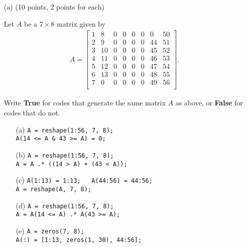 \documentclass[a4paper,10pt]{article}
\makeatletter
\newlength{\Problen}
\newlength{\Probheadlen}
\newlength{\Probskip}
\newenvironment{ProbK}{\begin{lrbox}{\@syntest}%
    \begin{minipage}\textwidth}{\end{minipage}\end{lrbox}}
\newenvironment{ProbK}[2][]{ %
    \global\setbox\@lastproblem=\vbox\bgroup
    \par\noindent\parbox[t]{\Probheadlen}{\raggedleft\fontsize{10}{10pt}\selectfont
    {\bfseries\large #2 }\\[-1.5mm]
    \rule[1mm]{16mm}{.2mm}\\[-2mm]{\sffamily #1}}\hspace{\Probskip}%
    \begin{minipage}[t]{\Problen}}{\end{minipage}\par\vspace{3mm}\egroup%
    \unvcopy\@lastproblem}
\theoremstyle{remark}
\makeatother
\begin{document}
\begin{ProbK}[pt 10]{8}
\begin{enumerate}
	\item[(a)] (10 points, 2 points for each)
	
	\vspace{1mm}
	Let $A$ be a $7 \times 8$ matrix given by
	\begin{align*}
		A =
		\begin{bmatrix}
			1 &  8 & 0 & 0 & 0 & 0 & 0 & 50\\
			2 &  9 & 0 & 0 & 0 & 0 & 44 & 51\\
			3 & 10 & 0 & 0 & 0 & 0 & 45 & 52\\
			4 & 11 & 0 & 0 & 0 & 0 & 46 & 53\\
			5 & 12 & 0 & 0 & 0 & 0 & 47 & 54\\
			6 & 13 & 0 & 0 & 0 & 0 & 48 & 55\\
			7 & 0 & 0 & 0 & 0 & 0 & 49 & 56\\
		\end{bmatrix}.
	\end{align*}
	
	Write \textbf{True} for codes that generate the same matrix $A$ as above, or \textbf{False} for codes that do not.
	
	\vspace{2mm}
	
	\begin{itemize}
		\item[(a)] 
		\verb"A = reshape(1:56, 7, 8);"\\
		\verb"A(14 <= A & 43 >= A) = 0;"
		
		\item[(b)] 
		\verb"A = reshape(1:56, 7, 8);"\\
		\verb"A = A .* ((14 > A) + (43 < A));"
		
		\item[(c)]
		\verb"A(1:13) = 1:13;   A(44:56) = 44:56;"\\
		\verb"A = reshape(A, 7, 8);"
		
		\item[(d)] 
		\verb"A = reshape(1:56, 7, 8);"\\
		\verb"A = A(14 <= A) .* A(43 >= A);"
		
		\item[(e)] 
		\verb"A = zeros(7, 8);"\\
		\verb"A(:) = [1:13, zeros(1, 30), 44:56];"
	\end{itemize}
\end{enumerate}
\end{ProbK}
\end{document}
